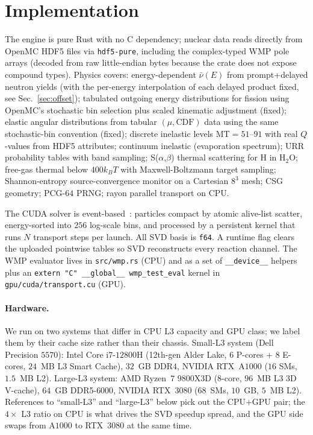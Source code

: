 \section{Implementation}
\label{sec:impl}

The engine is pure Rust with no C dependency; nuclear data
reads directly from OpenMC HDF5 files via \texttt{hdf5-pure},
including the complex-typed WMP pole arrays (decoded from raw
little-endian bytes because the crate does not expose
compound types). Physics covers: energy-dependent
$\bar\nu(E)$ from prompt+delayed neutron yields (with the
per-energy interpolation of each delayed product fixed, see
Sec.~\ref{sec:offset}); tabulated outgoing energy
distributions for fission using OpenMC's stochastic bin
selection plus scaled kinematic adjustment (fixed); elastic
angular distributions from tabular $(\mu, \text{CDF})$ data
using the same stochastic-bin convention (fixed); discrete
inelastic levels MT$=51$--$91$ with real $Q$-values from HDF5
attributes; continuum inelastic (evaporation spectrum);
URR probability tables with band sampling;
S($\alpha$,$\beta$) thermal scattering for H in H$_2$O;
free-gas thermal below $400 k_B T$ with Maxwell-Boltzmann
target sampling; Shannon-entropy source-convergence monitor
on a Cartesian $8^3$ mesh; CSG geometry; PCG-$64$ PRNG; rayon
parallel transport on CPU.

The CUDA solver is event-based~\cite{tramm2024}: particles
compact by atomic alive-list scatter, energy-sorted into
$256$ log-scale bins, and processed by a persistent kernel
that runs $N$ transport steps per launch. All SVD basis is
\texttt{f64}. A runtime flag clears the uploaded pointwise
tables so SVD reconstructs every reaction channel. The WMP
evaluator lives in \texttt{src/wmp.rs} (CPU) and as a set of
\texttt{\_\_device\_\_} helpers plus an
\texttt{extern "C" \_\_global\_\_ wmp\_test\_eval} kernel in
\texttt{gpu/cuda/transport.cu} (GPU).

\paragraph{Hardware.}
We run on two systems that differ in CPU L3 capacity and GPU
class; we label them by their cache size rather than their
chassis. Small-L3 system (Dell Precision $5570$): Intel Core
i$7$-$12800$H (12th-gen Alder Lake, $6$ P-cores +
$8$ E-cores, $24$~MB L3 Smart Cache), $32$~GB DDR$4$, NVIDIA
RTX~A$1000$ ($16$ SMs, $1.5$~MB L2). Large-L3 system: AMD Ryzen~$7$ $9800$X3D
($8$-core, $96$~MB L3 3D V-cache), $64$~GB DDR5-$6000$, NVIDIA
RTX~$3080$ ($68$~SMs, $10$~GB, $5$~MB L2). References to
``small-L3'' and ``large-L3'' below pick out the CPU+GPU pair;
the $4\times$ L3 ratio on CPU is what drives the SVD speedup
spread, and the GPU side swaps from A$1000$ to RTX~$3080$ at
the same time.

